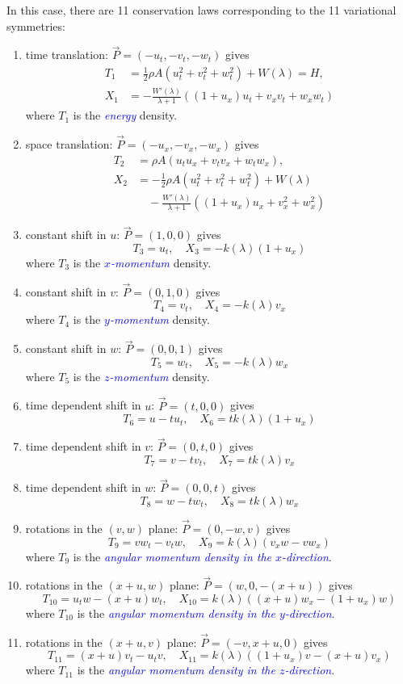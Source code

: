 \documentclass[landscape]{slides}
\def\myemph#1{\textcolor{blue}{\em #1}}
\begin{document}
\begin{itemize}
In this case, there are 11 conservation laws corresponding to the 11 variational symmetries:
\begin{enumerate}[label=\roman*.]
\item 
time translation: $\vec{P} = (-u_t, -v_t, -w_t)$ gives 
\[\begin{aligned} 
T_1 &= \frac{1}{2} \rho A (u_t^2 + v_t^2 + w_t^2) + W(\lambda) = H, \\
X_1 &= - \frac{W'(\lambda)}{\lambda + 1} 
(
(1 + u_x) u_t + v_x v_t + w_x w_t
)
\end{aligned}\]
where $T_1$ is the \myemph{energy} density.
\item 
space translation: $\vec{P} = (-u_x, -v_x, -w_x)$ gives 
\[\begin{aligned}
T_2 &= \rho A (u_t u_x + v_t v_x + w_t w_x), \\
X_2 &= -\frac{1}{2} \rho A (u_t^2 + v_t^2 + w_t^2)
+ W(\lambda) \\
& \quad - \frac{W'(\lambda)}{\lambda + 1} 
(
(1 + u_x) u_x + v_x^2 + w_x^2
)
\end{aligned}\]
\item 
constant shift in $u$:
$\vec{P} =(1,0,0)$ 
gives 
\[
T_3 = u_t,
\quad 
X_3 = -k(\lambda) (1 + u_x)      
\]
where $T_3$ is the \myemph{$x$-momentum} density.
\item 
constant shift in $v$:
$\vec{P} =(0,1,0)$ 
gives
\[
T_4 = v_t,
\quad 
X_4 = -k(\lambda) v_x     
\]
where $T_4$ is the \myemph{$y$-momentum} density.
\item 
constant shift in $w$: 
$\vec{P} =(0,0,1)$ 
gives
\[
T_5 = w_t,
\quad 
X_5 = -k(\lambda) w_x     
\]
where $T_5$ is the \myemph{$z$-momentum} density.
\item 
time dependent shift in $u$: 
$\vec{P} =(t,0,0)$ 
gives 
\[
T_6 = u - t u_t,
\quad
X_6 =  t k(\lambda) (1 + u_x)
\]
\item 
time dependent shift in $v$: 
$\vec{P} =(0,t,0)$ 
gives 
\[
T_7 = v - t v_t,
\quad
X_7 = t k(\lambda) v_x
\]
\item 
time dependent shift in $w$: 
$\vec{P} =(0,0,t)$ 
gives 
\[
T_8 = w - t w_t,
\quad
X_8 = t k(\lambda) w_x
\]
\item 
rotations in the $(v,w)$ plane: $\vec{P} =(0,-w,v)$ gives 
\[
T_9 = v w_t - v_t w,
\quad
X_9 = k(\lambda) (v_x w - v w_x)
\]
where $T_9$ is the \myemph{angular momentum density in the $x$-direction}.
\item 
rotations in the $(x+u,w)$ plane: $\vec{P} =(w,0,-(x+u))$ gives 
\[
T_{10} = u_t w - (x+u) w_t,  
\quad
X_{10} = k(\lambda) ((x + u) w_x - (1 + u_x) w)
\]
where $T_{10}$ is the \myemph{angular momentum density in the $y$-direction}.
\item 
rotations in the $(x+u,v)$ plane: $\vec{P} =(-v,x+u,0)$ gives 
\[
T_{11} = (x+u) v_t - u_t v,
\quad
X_{11} = k(\lambda) ((1 + u_x) v - (x + u) v_x )
\]
where $T_{11}$ is the \myemph{angular momentum density in the $z$-direction}.
\end{enumerate}


\end{itemize}
\end{document}
